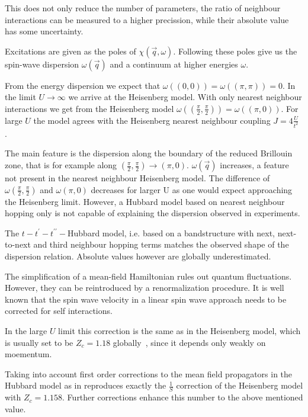 \documentclass[a4paper,10pt]{report}
\begin{document}
This does not only reduce the number of parameters, the ratio of neighbour interactions can be measured to a higher precission, while 
their absolute value has some uncertainty.





Excitations are given as the poles of $\chi(\vec q,\omega)$. 
Following these poles give us the spin-wave dispersion $\omega(\vec q)$ and a continuum at higher energies $\omega$.

From the energy dispersion  we expect that $\omega( (0,0) ) = \omega(( \pi,\pi )) = 0$.
In the limit $U\rightarrow \infty$ we arrive at the Heisenberg model. 
With only nearest neighbour interactions we get from the Heisenberg model
$\omega( (\frac{\pi}{2}, \frac{\pi}2 )) = \omega(( \pi,0))$.
For large $U$ the model agrees with the Heisenberg nearest neighbour coupling $J=4\frac{U}{t^2}$ .

The main feature is the dispersion along the boundary of the reduced Brillouin zone, that is for example along $(\frac{\pi}2,\frac{\pi}2) \rightarrow (\pi,0)$.
$\omega(\vec q)$ increases, a feature not present in the nearest neighbour Heisenberg model. 
The difference of $\omega(\frac{\pi}2,\frac{\pi}2)$ and $\omega(\pi,0)$ decreases for larger U as one would expect approaching the Heisenberg limit.
However, a Hubbard model based on nearest neighbour hopping only is not capable of explaining the dispersion observed in experiments.

The $t-t^{\prime}-t^{\prime \prime}-$Hubbard model, 
i.e. based on a bandstructure with next, next-to-next and third neighbour hopping terms 
matches the observed shape of the dispersion relation. 
Absolute values however are globally underestimated.

The simplification of a mean-field Hamiltonian rules out quantum fluctuations.
However, they can be reintroduced by a renormalization procedure.
It is well known 
that the spin wave velocity in a linear spin wave approach needs to be corrected for self interactions.

In the large $U$ limit this correction is the same as in the Heisenberg model, which is usually set to be $Z_c=1.18$ globally~\cite{PhysRevLett.86.5377}, 
since it depends only weakly on moementum.

Taking into account first order corrections to the mean field propagators  in the Hubbard model as in \cite{PhysRevB.43.3617} 
reproduces exactly the $\frac1S$ correction of the Heisenberg model with $Z_c=1.158$.
Further corrections enhance this number to the above mentioned value.
\end{document}
